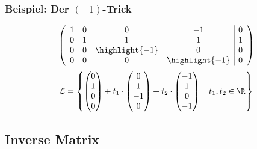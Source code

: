 %
%
\begin{frame}\frametitle{Beispiel: Der $(-1)$-Trick}

	$$
		\left(
		\begin{array}{cccc | c}
			1 & 0 & 0 		           	& -1 			& 0\\
			0 & 1 & 1 			   	& 1 			& 1\\
			0 & 0 & \highlight{-1} 	& 0 			& 0\\
			0 & 0 & 0 				& \highlight{-1} 	& 0
		\end{array}
		\right)
	$$
	\vfill
	$$
		\mathcal{L} =   \left\{ 
				\begin{pmatrix}
				0\\ 1\\0\\0
				\end{pmatrix}
				+
				t_1
				\cdot
				\begin{pmatrix}
					0\\1\\-1\\0
				\end{pmatrix}
				+
				t_2
				\cdot
				\begin{pmatrix}
					-1\\1\\0\\-1
				\end{pmatrix}
				~|~
				t_1,t_2 \in \R
			 \right\}
	$$
	
\end{frame}
%
\subsection{Inverse Matrix}
\makeSectionDividerPage

